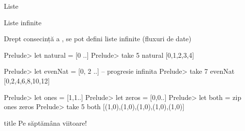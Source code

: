 \documentclass[xcolor=pdftex,romanian,colorlinks]{beamer}
\begin{document}
\begin{section}{Liste}
\begin{frame}[fragile]{Liste infinite}


\begin{block}{}

Drept consecință a , se pot defini liste infinite (fluxuri de date)
\end{block}

\begin{asciihs}
Prelude> let natural = [0 ..]
Prelude> take 5 natural
[0,1,2,3,4]
\end{asciihs}
\pause
\begin{asciihs}
Prelude> let evenNat = [0, 2 ..] -- progresie infinita
Prelude> take 7 evenNat
[0,2,4,6,8,10,12]
\end{asciihs}
\pause
\begin{asciihs}
Prelude> let ones = [1,1..]
Prelude> let zeros = [0,0..]
Prelude> let both = zip ones zeros
Prelude> take 5 both
[(1,0),(1,0),(1,0),(1,0),(1,0)]
\end{asciihs}


\end{frame}





\end{section}










 \begin{frame}
  \vfill
  \centering
  \begin{beamercolorbox}[sep=8pt,center,shadow=true,rounded=true]{title}
     Pe săptămâna viitoare! \par%
  \end{beamercolorbox}
  \vfill
  \end{frame}
\end{document}
